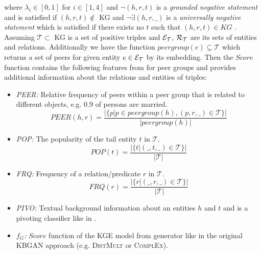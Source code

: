 where $\lambda_i \in [0, 1]$ for $i \in [1,4]$ and $\neg (h, r, t)$ is a \textit{grounded negative statement} and is satisfied if $(h, r, t) \notin$ KG and $\neg\exists(h, r, \_)$ is a \textit{universally negative statement} which is satisfied if there exists no $t$ such that $(h, r, t) \in KG$ \cite{arnaout2020enriching}.\\
Assuming $\mathcal{T} \subset $ \ac{KG} is a set of positive triples and $\mathcal{E}_{\mathcal{T}}$, $\mathcal{R}_{\mathcal{T}}$ are its sets of entities and relations.
Additionally we have the function $peergroup(e) \subseteq \mathcal{T}$ which returns a set of peers for given entity $e \in \mathcal{E}_{\mathcal{T}}$ by its embedding. 
Then the $Score$ function contains the following features from \cite{arnaout2020enriching} for peer groups and provides additional information about the relations and entities of triples:
\begin{itemize}
    \item 
    \emph{\ac{PEER}:} 
    Relative frequency of peers within a peer group that is related to different objects, e.g. 0.9 of persons are married. 
    \begin{equation}
        PEER(h,r) = \frac{|\{p | p \in peergroup(h), (p, r, \_) \in \mathcal{T}\}|}{|peergroup(h)|}
    \end{equation}

    \item
    \emph{\ac{POP}:} 
    The popularity of the tail entity $t$ in $\mathcal{T}$. 
    \begin{equation}
        POP(t) = \frac{|\{t | (\_, t, \_) \in \mathcal{T}\}|}{|\mathcal{T}|}
    \end{equation}

    \item 
    \emph{\ac{FRQ}:} 
    Frequency of a relation/predicate $r$ in $\mathcal{T}$. 
    \begin{equation}
        FRQ(r) = \frac{|\{r | (\_, r, \_) \in \mathcal{T}\}|}{|\mathcal{T}|}
    \end{equation}
    
    \item 
    \emph{\ac{PIVO}:} 
    Textual background information about an entities $h$ and $t$ and is a pivoting classifier like in \cite{arnaout2020enriching}.
    
    \item 
    \emph{$f_G$:} 
    $Score$ function of the \ac{KGE}  model from generator like in the original \ac{KBGAN} approach (e.g. \textsc{DistMult}  or \textsc{ComplEx}).
    
\end{itemize}

